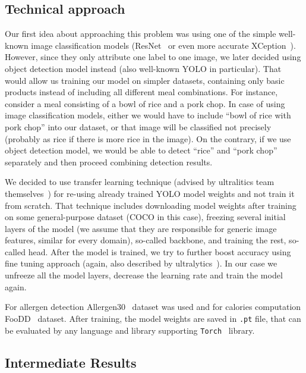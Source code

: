\documentclass[10pt,twocolumn,letterpaper]{article}
\begin{document}
\subsection{Technical approach}

Our first idea about approaching this problem was using one of the simple well-known image classification models (ResNet~\cite{he2015deepresiduallearningimage} or even more accurate XCeption~\cite{chollet2017xceptiondeeplearningdepthwise}).
However, since they only attribute one label to one image, we later decided using object detection model instead (also well-known YOLO in particular).
That would allow us training our model on simpler datasets, containing only basic products instead of including all different meal combinations.
For instance, consider a meal consisting of a bowl of rice and a pork chop.
In case of using image classification models, either we would have to include ``bowl of rice with pork chop'' into our dataset, or that image will be classified not precisely (probably as rice if there is more rice in the image).
On the contrary, if we use object detection model, we would be able to detect ``rice'' and ``pork chop'' separately and then proceed combining detection results.

We decided to use transfer learning technique (advised by ultralitics team themselves~\cite{ultralytics2024transferlearning}) for re-using already trained YOLO model weights and not train it from scratch.
That technique includes downloading model weights after training on some general-purpose dataset (COCO in this case), freezing several initial layers of the model (we assume that they are responsible for generic image features, similar for every domain), so-called backbone, and training the rest, so-called head.
After the model is trained, we try to further boost accuracy using fine tuning approach (again, also described by ultralytics~\cite{ultralytics2024finetuning}).
In our case we unfreeze all the model layers, decrease the learning rate and train the model again.

For allergen detection Allergen30~\cite{mishra2022allergen30} dataset was used and for calories computation FooDD~\cite{yvk7qk3820} dataset.
After training, the model weights are saved in \texttt{.pt} file, that can be evaluated by any language and library supporting \texttt{Torch}~\cite{torchlibrary} library.

\subsection{Intermediate Results}
\end{document}
